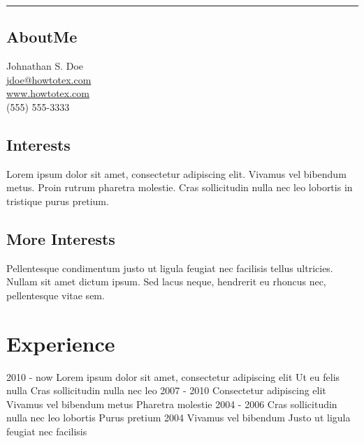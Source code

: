 \documentclass[]{viccuad-cv}
\begin{document}




\begin{flushright}
    \rule{2.6cm}{3.2cm}%
    \subsection{AboutMe}
        Johnathan S. Doe \\
        \url{jdoe@howtotex.com}  \\
        \url{www.howtotex.com} \\
        (555) 555-3333
    \subsection{Interests}
	 Lorem ipsum dolor sit amet, consectetur adipiscing elit. Vivamus vel bibendum metus. Proin rutrum pharetra molestie. Cras sollicitudin nulla nec leo lobortis in tristique purus pretium.
    \subsection{More Interests}
	Pellentesque condimentum justo ut ligula feugiat nec facilisis tellus ultricies. Nullam sit amet dictum ipsum. Sed lacus neque, hendrerit eu rhoncus nec, pellentesque vitae sem.

\end{flushright}

\framebreak

 
\section{Experience}
    \begin{entrylistdated}
      \entrydated
        {2010 - now}
        {Lorem ipsum dolor sit amet, consectetur adipiscing elit}
        {Ut eu felis nulla}
        {Cras sollicitudin nulla nec leo}
      \entrydated
        {2007 - 2010}
        {Consectetur adipiscing elit}
        {Vivamus vel bibendum metus}
        {Pharetra molestie}
      \entrydated
        {2004 - 2006}
        {Cras sollicitudin nulla nec leo lobortis}
        {}
        {Purus pretium} 
      \entrydated
        {2004}
        {Vivamus vel bibendum}
        {Justo ut ligula feugiat nec facilisis}
        {}
    \end{entrylistdated}
\end{document}
